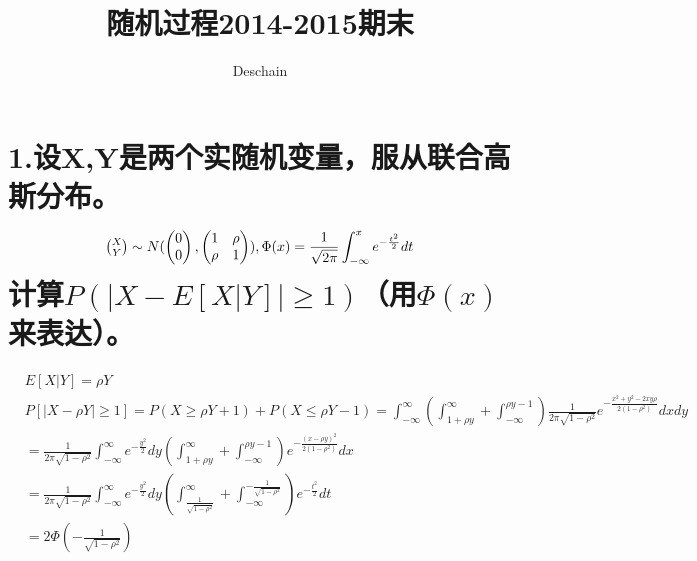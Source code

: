 \documentclass[UTF8]{ctexart}
\title{随机过程2014-2015期末}
\author{Deschain}
\begin{document}
\maketitle
\section*{1.设X,Y是两个实随机变量，服从联合高斯分布。
\begin{equation*}
  \tbinom{X}{Y}\sim N(
  \begin{pmatrix}
    0 \\0
  \end{pmatrix},
  \begin{pmatrix}
    1    & \rho \\
    \rho & 1
  \end{pmatrix}
  ),
  \Phi(x)=\frac{1}{\sqrt{2\pi}}\int_{-\infty}^xe^{-\frac{t^2}{2}}dt
\end{equation*}
计算$P(\lvert X-E[X\lvert Y]\rvert\geq1)$（用$\Phi(x)$来表达）。
}
\begin{equation*}
  \begin{aligned}
     & E[X\lvert Y]=\rho Y                                                       \\
     & P[\lvert X-\rho Y\rvert\geq1]=P(X\geq\rho Y+1)+P(X\leq\rho Y-1)
    =\int_{-\infty}^{\infty}(\int_{1+\rho y}^\infty+\int_{-\infty}^{\rho y-1})
    \frac{1}{2\pi\sqrt{1-\rho^2}}e^{-\frac{x^2+y^2-2xy\rho}{2(1-\rho^2)}}dxdy    \\
     & =\frac{1}{2\pi\sqrt{1-\rho^2}}\int_{-\infty}^{\infty}e^{-\frac{y^2}{2}}dy
    (\int_{1+\rho y}^\infty+\int_{-\infty}^{\rho y-1})
    e^{-\frac{(x-\rho y)^2}{2(1-\rho^2)}}dx                                      \\
     & =\frac{1}{2\pi\sqrt{1-\rho^2}}\int_{-\infty}^{\infty}e^{-\frac{y^2}{2}}dy
    (\int_{\frac{1}{\sqrt{1-\rho^2}}}^\infty+\int_{-\infty}^{-\frac{1}{\sqrt{1-\rho^2}}})
    e^{-\frac{t^2}{2}}dt                                                         \\
     & =2\Phi(-\frac{1}{\sqrt{1-\rho^2}})                                        \\
  \end{aligned}
\end{equation*}
\end{document}
